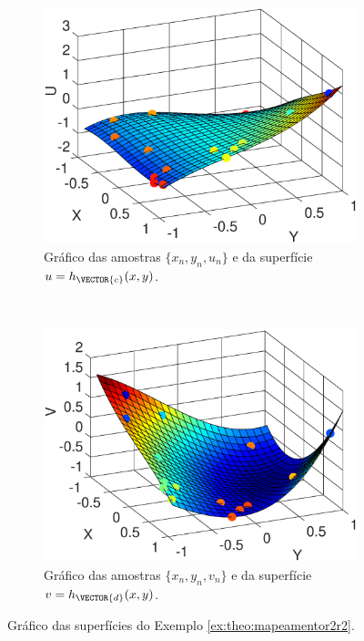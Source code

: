\begin{figure}[!h]
\centering
    \begin{subfigure}[b]{0.45\textwidth}
        \centering
        \includegraphics[width=\textwidth]{chapters/mapeamento/mfiles/mapeamentor2r2/minimizando_hxc.eps}
        \caption{Gráfico das amostras $\{x_n,y_n,u_n\}$ e da superfície $u=h_{\VECTOR{c}}(x,y)$.}
        \label{fig:theo:maphxr2r1:xnynun}
    \end{subfigure}
    ~
    \begin{subfigure}[b]{0.45\textwidth}
        \centering
        \includegraphics[width=\textwidth]{chapters/mapeamento/mfiles/mapeamentor2r2/minimizando_hxd.eps}
        \caption{Gráfico das amostras $\{x_n,y_n,v_n\}$ e da superfície $v=h_{\VECTOR{d}}(x,y)$.}
        \label{fig:theo:maphxr2r1:xnynvn}
    \end{subfigure}
\caption{Gráfico das superfícies do Exemplo \ref{ex:theo:mapeamentor2r2}.}
\label{fig:theo:maphxr2r1:xnynunvn}
\end{figure}
